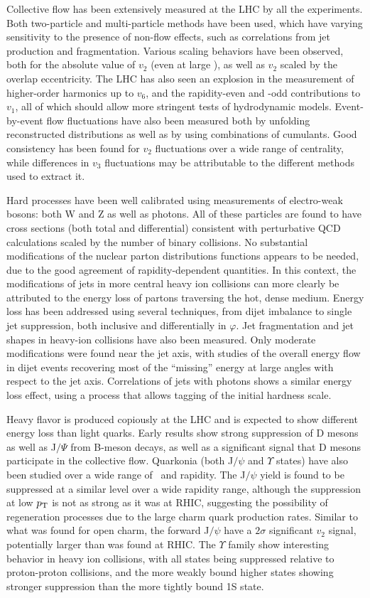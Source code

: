 Collective flow has been extensively measured at the LHC by all the experiments.
Both two-particle and multi-particle methods have been used, which have varying sensitivity to
the presence of non-flow effects, such as correlations from jet production and fragmentation.
Various scaling behaviors have been observed, both for the absolute value of $v_2$ (even at
large \pT), as well as $v_2$ scaled by the overlap eccentricity.
The LHC has also seen an explosion in the measurement of higher-order harmonics up to $v_6$,
and the rapidity-even and -odd contributions to $v_1$, all of which should
allow more stringent tests of hydrodynamic models.
Event-by-event flow fluctuations have also been measured both by unfolding reconstructed
distributions as well as by using combinations of cumulants.  Good consistency has been found
for $v_2$ fluctuations over a wide range of centrality, while differences in $v_3$
fluctuations may be attributable to the different methods used to extract it.

Hard processes have been well calibrated using measurements of electro-weak bosons: both
W and Z as well as photons.  All of these particles are found to have cross sections
(both total and differential)
consistent with perturbative QCD calculations scaled by the number of binary collisions.
No substantial modifications of the nuclear parton distributions functions appears to be needed, due to the good
agreement of rapidity-dependent quantities.
In this context, the modifications of jets in more central heavy ion collisions can more
clearly be attributed to the energy loss of partons traversing the hot, dense medium.
Energy loss has been addressed using several techniques, from dijet imbalance
to single jet suppression, both inclusive and differentially in $\varphi$.  Jet fragmentation and
jet shapes in heavy-ion collisions have also been measured. Only moderate modifications were
found near the jet axis, with studies of the overall energy flow in dijet events recovering 
most of the ``missing'' energy at large angles with respect to the jet axis.
Correlations of jets with photons shows a similar energy loss effect, using a process that allows
tagging of the initial hardness scale.

Heavy flavor is produced copiously at the LHC and is expected to show different energy loss than
light quarks.  Early results show strong suppression of D mesons as well as J$/\Psi$ from
B-meson decays, as well as a significant signal that D mesons participate in the collective flow.
Quarkonia (both J$/\psi$ and $\Upsilon$ states) have also been studied over a wide range of \pT\
and rapidity.  The J$/\psi$ yield is found to be suppressed at a similar level over a wide
rapidity range, although the suppression at low $\mbox{$p_{\mathrm{T}}$}$ is not as strong as it was at
RHIC, suggesting the possibility of regeneration processes due to the large charm quark production
rates.  Similar to what was found for open charm, the forward J$/\psi$ have a
$2\sigma$ significant $v_2$ signal, potentially larger than was found at RHIC.
The $\Upsilon$ family show interesting behavior in heavy ion collisions, with all states being
suppressed relative to proton-proton collisions, and the more weakly bound higher states showing
stronger suppression than the more tightly bound 1S state.

